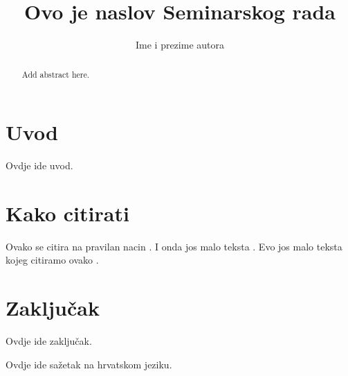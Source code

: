 \documentclass[times, utf8, seminar, numeric]{templates/template}
\begin{document}


\title{Ovo je naslov Seminarskog rada}

\author{Ime i prezime autora}

\maketitle

\tableofcontents

\chapter{Uvod}
Ovdje ide uvod.

\chapter{Kako citirati}
Ovako se citira na pravilan nacin \cite{oetiket2007lshort}. I onda jos malo teksta \cite{downes2002shortams}. 
Evo jos malo teksta kojeg citiramo ovako \cite{ungar2002uvod}.

\chapter{Zaključak}
Ovdje ide zaključak.




\begin{sazetak}
Ovdje ide sažetak na hrvatskom jeziku.

\end{sazetak}

\begin{abstract}
Add abstract here.

\end{abstract}
\end{document}
